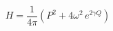 \begin{equation}\label{m-Hamiltonian}
H=\frac{1}{4\pi}\left(P^2+4\omega^2\, e^{2\gamma Q}\right)
\end{equation}

